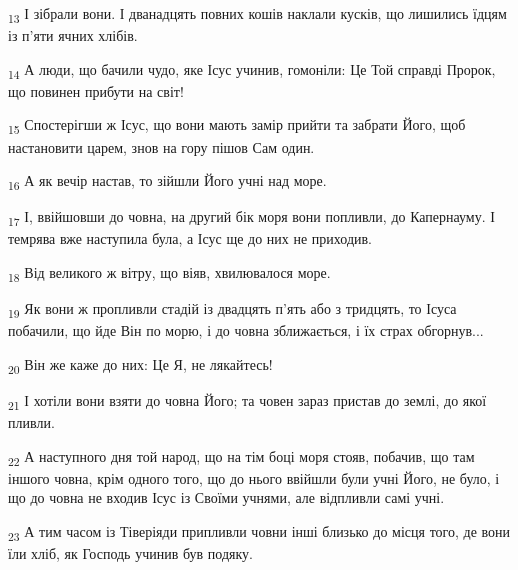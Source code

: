\begin{tcolorbox}
\textsubscript{13} І зібрали вони. І дванадцять повних кошів наклали кусків, що лишились їдцям із п'яти ячних хлібів.
\end{tcolorbox}
\begin{tcolorbox}
\textsubscript{14} А люди, що бачили чудо, яке Ісус учинив, гомоніли: Це Той справді Пророк, що повинен прибути на світ!
\end{tcolorbox}
\begin{tcolorbox}
\textsubscript{15} Спостерігши ж Ісус, що вони мають замір прийти та забрати Його, щоб настановити царем, знов на гору пішов Сам один.
\end{tcolorbox}
\begin{tcolorbox}
\textsubscript{16} А як вечір настав, то зійшли Його учні над море.
\end{tcolorbox}
\begin{tcolorbox}
\textsubscript{17} І, ввійшовши до човна, на другий бік моря вони попливли, до Капернауму. І темрява вже наступила була, а Ісус ще до них не приходив.
\end{tcolorbox}
\begin{tcolorbox}
\textsubscript{18} Від великого ж вітру, що віяв, хвилювалося море.
\end{tcolorbox}
\begin{tcolorbox}
\textsubscript{19} Як вони ж пропливли стадій із двадцять п'ять або з тридцять, то Ісуса побачили, що йде Він по морю, і до човна зближається, і їх страх обгорнув...
\end{tcolorbox}
\begin{tcolorbox}
\textsubscript{20} Він же каже до них: Це Я, не лякайтесь!
\end{tcolorbox}
\begin{tcolorbox}
\textsubscript{21} І хотіли вони взяти до човна Його; та човен зараз пристав до землі, до якої пливли.
\end{tcolorbox}
\begin{tcolorbox}
\textsubscript{22} А наступного дня той народ, що на тім боці моря стояв, побачив, що там іншого човна, крім одного того, що до нього ввійшли були учні Його, не було, і що до човна не входив Ісус із Своїми учнями, але відпливли самі учні.
\end{tcolorbox}
\begin{tcolorbox}
\textsubscript{23} А тим часом із Тіверіяди припливли човни інші близько до місця того, де вони їли хліб, як Господь учинив був подяку.
\end{tcolorbox}
